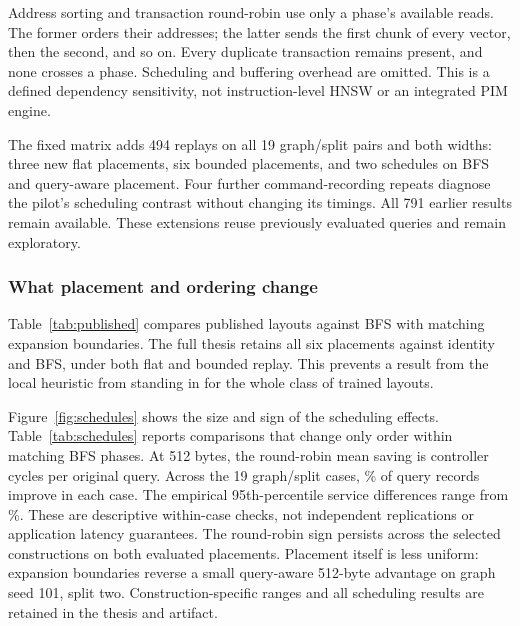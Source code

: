 Address sorting and transaction round-robin use only a phase's available reads. The former orders their addresses; the latter sends the first chunk of every vector, then the second, and so on. Every duplicate transaction remains present, and none crosses a phase. Scheduling and buffering overhead are omitted. This is a defined dependency sensitivity, not instruction-level HNSW or an integrated PIM engine.

The fixed matrix adds 494 replays on all 19 graph/split pairs and both widths: three new flat placements, six bounded placements, and two schedules on BFS and query-aware placement. Four further command-recording repeats diagnose the pilot's scheduling contrast without changing its timings. All 791 earlier results remain available. These extensions reuse previously evaluated queries and remain exploratory.

\subsubsection{What placement and ordering change}
Table~\ref{tab:published} compares published layouts against BFS with matching expansion boundaries. The full thesis retains all six placements against identity and BFS, under both flat and bounded replay. This prevents a result from the local heuristic from standing in for the whole class of trained layouts.

\begin{table}[htbp]\centering\small
\caption{Published placement routines under bounded replay. Mean cycle differences and 95\% intervals over ten reference splits. Negative means fewer cycles than matching BFS.}\label{tab:published}

\end{table}

Figure~\ref{fig:schedules} shows the size and sign of the scheduling effects. Table~\ref{tab:schedules} reports comparisons that change only order within matching BFS phases. At 512 bytes, the round-robin mean saving is \RoundRobinBFSSavedFloat{} controller cycles per original query. Across the 19 graph/split cases, \RRFasterQueriesFloat\% of query records improve in each case. The empirical 95th-percentile service differences range from \RRPtailRangeFloat\%. These are descriptive within-case checks, not independent replications or application latency guarantees. The round-robin sign persists across the selected constructions on both evaluated placements. Placement itself is less uniform: expansion boundaries reverse a small query-aware 512-byte advantage on graph seed 101, split two. Construction-specific ranges and all scheduling results are retained in the thesis and artifact.

